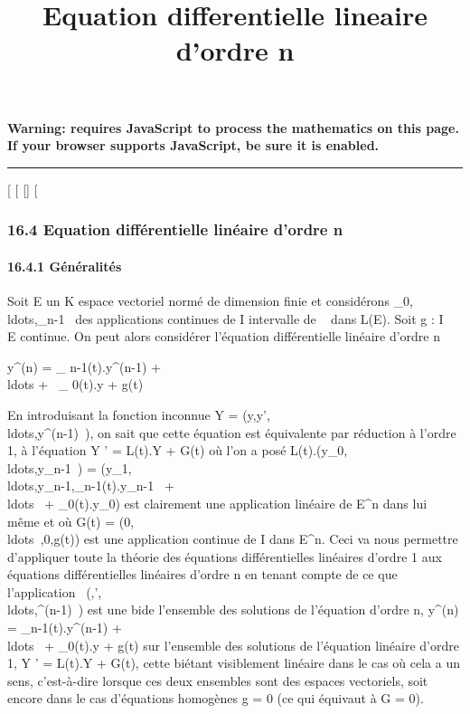 \documentclass[]{article}
\title{Equation differentielle lineaire d'ordre n}
\author{}
\date{}
\begin{document}
\maketitle

\textbf{Warning: 
requires JavaScript to process the mathematics on this page.\\ If your
browser supports JavaScript, be sure it is enabled.}

\begin{center}\rule{3in}{0.4pt}\end{center}

{[}
{[}
{[}{]}
{[}

\subsubsection{16.4 Equation différentielle linéaire d'ordre n}

\paragraph{16.4.1 Généralités}

Soit E un K espace vectoriel normé de dimension finie et considérons
\ell\_0,\\ldots,\ell\_n-1~
des applications continues de I intervalle de ~ dans L(E). Soit g : I \rightarrow~
E continue. On peut alors considérer l'équation différentielle linéaire
d'ordre n

y^(n) = \ell\_ n-1(t).y^(n-1) +
\\ldots + \ell~\_
0(t).y + g(t)

En introduisant la fonction inconnue Y =
(y,y',\\ldots,y^(n-1)~),
on sait que cette équation est équivalente par réduction à l'ordre 1, à
l'équation Y ' = L(t).Y + G(t) où l'on a posé
L(t).(y\_0,\\ldots,y\_n-1~)
=
(y\_1,\\ldots,y\_n-1,\ell\_n-1(t).y\_n-1~
+ \\ldots~ +
\ell\_0(t).y\_0) est clairement une application linéaire de
E^n dans lui même et où G(t) =
(0,\\ldots~,0,g(t))
est une application continue de I dans E^n. Ceci va nous
permettre d'appliquer toute la théorie des équations différentielles
linéaires d'ordre 1 aux équations différentielles linéaires d'ordre n en
tenant compte de ce que l'application
\phi\mapsto~(\phi,\phi',\\ldots,\phi^(n-1)~)
est une bi\jmathection de l'ensemble des solutions de l'équation d'ordre n,
y^(n) = \ell\_n-1(t).y^(n-1) +
\\ldots~ +
\ell\_0(t).y + g(t) sur l'ensemble des solutions de l'équation
linéaire d'ordre 1, Y ' = L(t).Y + G(t), cette bi\jmathection étant
visiblement linéaire dans le cas où cela a un sens, c'est-à-dire lorsque
ces deux ensembles sont des espaces vectoriels, soit encore dans le cas
d'équations homogènes g = 0 (ce qui équivaut à G = 0).
\end{document}

